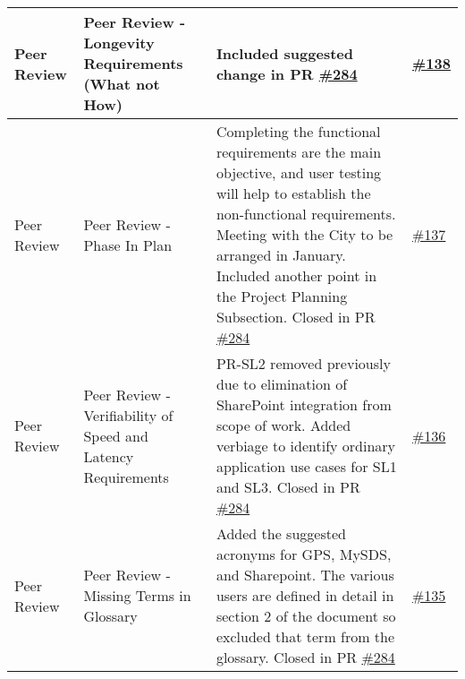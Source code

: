\documentclass{article}
\begin{document}
\begin{longtable}{|m{3cm}|m{3cm}|m{5cm}|m{1cm}|}
 \hline
 Peer Review & Peer Review - Longevity Requirements (What not How) & Included suggested change in PR \href{https://github.com/Spitgranger/SyncMaster/pull/284}{\#284} 
 & \href{https://github.com/Spitgranger/SyncMaster/pull/138}{\#138}\\
 \hline
 Peer Review & Peer Review - Phase In Plan & Completing the functional requirements are the main objective, and user testing will help to establish the non-functional requirements. 
 Meeting with the City to be arranged in January. Included another point in the Project Planning Subsection. Closed in PR \href{https://github.com/Spitgranger/SyncMaster/pull/284}{\#284} 
 & \href{https://github.com/Spitgranger/SyncMaster/pull/137}{\#137}\\
 \hline
 Peer Review & Peer Review - Verifiability of Speed and Latency Requirements & PR-SL2 removed previously due to elimination of SharePoint integration from scope of work.
 Added verbiage to identify ordinary application use cases for SL1 and SL3. Closed in PR \href{https://github.com/Spitgranger/SyncMaster/pull/284}{\#284} 
 & \href{https://github.com/Spitgranger/SyncMaster/pull/136}{\#136} \\
 \hline
 Peer Review & Peer Review - Missing Terms in Glossary & Added the suggested acronyms for GPS, MySDS, and Sharepoint. 
 The various users are defined in detail in section 2 of the document so excluded that term from the glossary. Closed in PR \href{https://github.com/Spitgranger/SyncMaster/pull/284}{\#284}
 & \href{https://github.com/Spitgranger/SyncMaster/pull/135}{\#135}\\
 \hline
\end{longtable}
\end{document}
